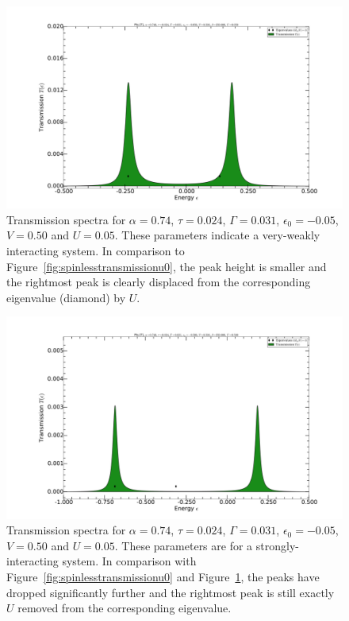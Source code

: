 \begin{figure}[!bt]
    \centering
    \includegraphics[height=.35\textheight,clip=true,trim=7cm 2cm 7cm 4cm]{pdf/trans/decospinlesstransmissionarbitraryu1.pdf}
    \caption{Transmission spectra for $\alpha=0.74$, $\tau=0.024$, $\Gamma=0.031$, $\epsilon_0 = - 0.05$, $V=0.50$ and $U=0.05$. These parameters indicate a very-weakly interacting system. In comparison to Figure~\ref{fig:spinlesstransmissionu0}, the peak height is smaller and the rightmost peak is clearly displaced from the corresponding eigenvalue (diamond) by $U$. }
    \label{fig:spinlesstransmissionu1}
\end{figure}
\begin{figure}[!bt]
    \centering
    \includegraphics[height=.35\textheight,clip=true,trim=7cm 2cm 7cm 4cm]{pdf/trans/decospinlesstransmissionarbitraryu4.pdf}
    \caption{Transmission spectra for $\alpha=0.74$, $\tau=0.024$, $\Gamma=0.031$, $\epsilon_0 = - 0.05$, $V=0.50$ and $U=0.05$. These parameters are for a strongly-interacting system. In comparison with Figure~\ref{fig:spinlesstransmissionu0} and Figure~\ref{fig:spinlesstransmissionu1}, the peaks have dropped significantly further and the rightmost peak is still exactly $U$ removed from the corresponding eigenvalue.}
    \label{fig:spinlesstransmissionu4}
\end{figure}

